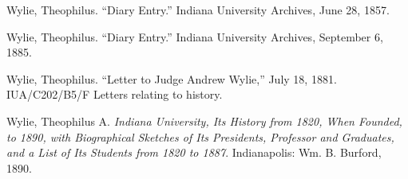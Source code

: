 \documentclass[
  american,
  letterpaper,
]{scrreprt}
\newlength{\cslhangindent}
\newenvironment{CSLReferences}[2] %
 {\begin{list}{}{%
  \setlength{\itemindent}{0pt}
  \setlength{\leftmargin}{0pt}
  \setlength{\parsep}{0pt}
  \ifodd #1
   \setlength{\leftmargin}{\cslhangindent}
   \setlength{\itemindent}{-1\cslhangindent}
  \fi
  \setlength{\itemsep}{#2\baselineskip}}}
 {\end{list}}
\begin{document}
\begin{CSLReferences}{1}{0}
Wylie, Theophilus. {``Diary Entry.''} Indiana University Archives, June
28, 1857.

Wylie, Theophilus. {``Diary Entry.''} Indiana University Archives,
September 6, 1885.

Wylie, Theophilus. {``Letter to Judge Andrew Wylie,''} July 18, 1881.
IUA/C202/B5/F Letters relating to history.

Wylie, Theophilus A. \emph{Indiana University, Its History from 1820,
When Founded, to 1890, with Biographical Sketches of Its Presidents,
Professor and Graduates, and a List of Its Students from 1820 to 1887}.
Indianapolis: Wm. B. Burford, 1890.

\end{CSLReferences}
\end{document}
